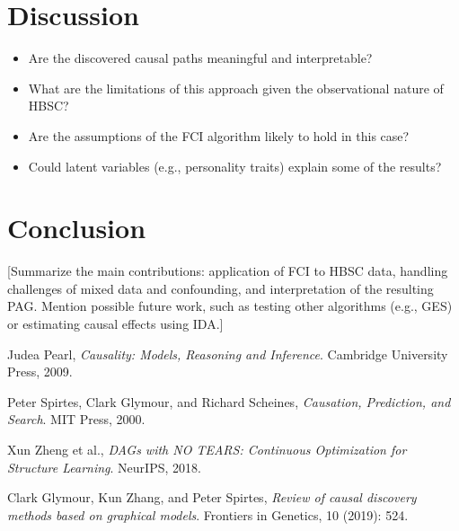 \documentclass[a4paper]{article}
\begin{document}
\section{Discussion}
\label{sec:discussion}

\begin{itemize}
    \item Are the discovered causal paths meaningful and interpretable?
    \item What are the limitations of this approach given the observational nature of HBSC?
    \item Are the assumptions of the FCI algorithm likely to hold in this case?
    \item Could latent variables (e.g., personality traits) explain some of the results?
\end{itemize}

\section{Conclusion}
\label{sec:conclusion}

[Summarize the main contributions: application of FCI to HBSC data, handling challenges of mixed data and confounding, and interpretation of the resulting PAG. Mention possible future work, such as testing other algorithms (e.g., GES) or estimating causal effects using IDA.]

\begin{thebibliography}{9}
  Judea Pearl,
  \emph{Causality: Models, Reasoning and Inference}.
  Cambridge University Press, 2009.

  Peter Spirtes, Clark Glymour, and Richard Scheines,
  \emph{Causation, Prediction, and Search}.
  MIT Press, 2000.

  Xun Zheng et al.,
  \emph{DAGs with NO TEARS: Continuous Optimization for Structure Learning}.
  NeurIPS, 2018.

  Clark Glymour, Kun Zhang, and Peter Spirtes,
  \emph{Review of causal discovery methods based on graphical models}.
  Frontiers in Genetics, 10 (2019): 524.
\end{thebibliography}
\end{document}
